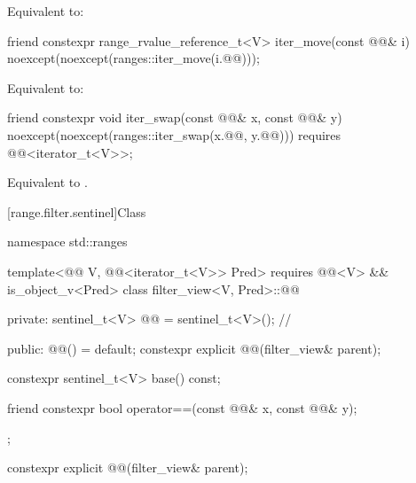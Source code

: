 \begin{itemdescr}
\pnum
\effects
Equivalent to: 
\end{itemdescr}

%
\begin{itemdecl}
friend constexpr range_rvalue_reference_t<V> iter_move(const @@& i)
  noexcept(noexcept(ranges::iter_move(i.@@)));
\end{itemdecl}

\begin{itemdescr}
\pnum
\effects
Equivalent to: 
\end{itemdescr}

%
\begin{itemdecl}
friend constexpr void iter_swap(const @@& x, const @@& y)
  noexcept(noexcept(ranges::iter_swap(x.@@, y.@@)))
  requires @@<iterator_t<V>>;
\end{itemdecl}

\begin{itemdescr}
\pnum
\effects
Equivalent to .
\end{itemdescr}

[range.filter.sentinel]{Class }

%
\begin{codeblock}
namespace std::ranges {
  template<@@ V, @@<iterator_t<V>> Pred>
    requires @@<V> && is_object_v<Pred>
  class filter_view<V, Pred>::@@ {
  private:
    sentinel_t<V> @@ = sentinel_t<V>();       // \expos

  public:
    @@() = default;
    constexpr explicit @@(filter_view& parent);

    constexpr sentinel_t<V> base() const;

    friend constexpr bool operator==(const @@& x, const @@& y);
  };
}
\end{codeblock}

%
\begin{itemdecl}
constexpr explicit @@(filter_view& parent);
\end{itemdecl}

